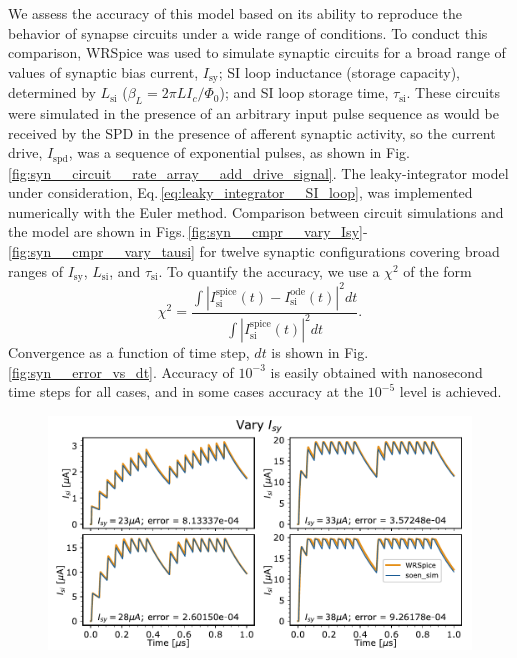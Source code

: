 \documentclass[twocolumn]{article}
\begin{document}
We assess the accuracy of this model based on its ability to reproduce the behavior of synapse circuits under a wide range of conditions. To conduct this comparison, WRSpice was used to simulate synaptic circuits for a broad range of values of synaptic bias current, $I_{\mathrm{sy}}$; SI loop inductance (storage capacity), determined by $L_{\mathrm{si}}$ ($\beta_L = 2\pi L I_c/\Phi_0$); and SI loop storage time, $\tau_{\mathrm{si}}$. These circuits were simulated in the presence of an arbitrary input pulse sequence as would be received by the SPD in the presence of afferent synaptic activity, so the current drive, $I_{\mathrm{spd}}$, was a sequence of exponential pulses, as shown in Fig.\,\ref{fig:syn__circuit__rate_array__add_drive_signal}. The leaky-integrator model under consideration, Eq.\,\ref{eq:leaky_integrator__SI_loop}, was implemented numerically with the Euler method. Comparison between circuit simulations and the model are shown in Figs.\,\ref{fig:syn__cmpr__vary_Isy}-\ref{fig:syn__cmpr__vary_tausi} for twelve synaptic configurations covering broad ranges of $I_{\mathrm{sy}}$, $L_{\mathrm{si}}$, and $\tau_{\mathrm{si}}$. To quantify the accuracy, we use a $\chi^2$ of the form
\begin{equation}
\label{eq:chi_squared}
\chi^2 = \frac{\int \left|I_{\mathrm{si}}^{\mathrm{spice}}(t) - I_{\mathrm{si}}^{\mathrm{ode}}(t)\right|^2 dt}{\int \left|I_{\mathrm{si}}^{\mathrm{spice}}(t)\right|^2 dt}.
\end{equation}
Convergence as a function of time step, $dt$ is shown in Fig.\,\ref{fig:syn__error_vs_dt}. Accuracy of $10^{-3}$ is easily obtained with nanosecond time steps for all cases, and in some cases accuracy at the $10^{-5}$ level is achieved. 



\begin{figure}[h!]
\includegraphics[width=17.2cm]{figures/_04__syn__cmpr__vary_Isy.pdf}
\end{figure}
\end{document}
